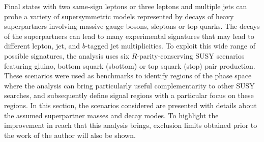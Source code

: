 
Final states with two same-sign leptons or three leptons and multiple jets can probe a variety of supersymmetric models 
represented by decays of heavy superpartners involving massive gauge bosons, sleptons or top quarks. 
The decays of the superpartners can lead to many experimental signatures that may lead to different lepton, jet, and $b$-tagged jet multiplicities.
To exploit this wide range of possible signatures, the analysis uses six $R$-parity-conserving SUSY scenarios 
featuring gluino, bottom squark (sbottom) or top squark (stop) pair production. 
These scenarios were used as benchmarks to identify regions of the phase space 
where the analysis can bring particularly useful complementarity to other SUSY 
searches, 
and subsequently define signal regions with a particular focus on these 
regions. 
In this section, the scenarios considered are presented with details about 
the assumed superpartner masses and decay modes.  
To highlight the improvement in reach that this analysis brings, exclusion limits obtained prior to the work of the author will also
be shown.

